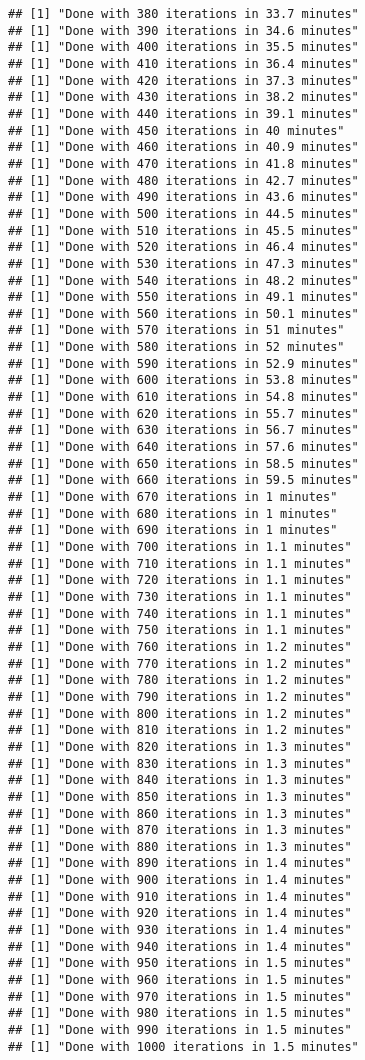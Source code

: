 \documentclass[]{article}
\begin{document}
\begin{verbatim}
## [1] "Done with 380 iterations in 33.7 minutes"
## [1] "Done with 390 iterations in 34.6 minutes"
## [1] "Done with 400 iterations in 35.5 minutes"
## [1] "Done with 410 iterations in 36.4 minutes"
## [1] "Done with 420 iterations in 37.3 minutes"
## [1] "Done with 430 iterations in 38.2 minutes"
## [1] "Done with 440 iterations in 39.1 minutes"
## [1] "Done with 450 iterations in 40 minutes"
## [1] "Done with 460 iterations in 40.9 minutes"
## [1] "Done with 470 iterations in 41.8 minutes"
## [1] "Done with 480 iterations in 42.7 minutes"
## [1] "Done with 490 iterations in 43.6 minutes"
## [1] "Done with 500 iterations in 44.5 minutes"
## [1] "Done with 510 iterations in 45.5 minutes"
## [1] "Done with 520 iterations in 46.4 minutes"
## [1] "Done with 530 iterations in 47.3 minutes"
## [1] "Done with 540 iterations in 48.2 minutes"
## [1] "Done with 550 iterations in 49.1 minutes"
## [1] "Done with 560 iterations in 50.1 minutes"
## [1] "Done with 570 iterations in 51 minutes"
## [1] "Done with 580 iterations in 52 minutes"
## [1] "Done with 590 iterations in 52.9 minutes"
## [1] "Done with 600 iterations in 53.8 minutes"
## [1] "Done with 610 iterations in 54.8 minutes"
## [1] "Done with 620 iterations in 55.7 minutes"
## [1] "Done with 630 iterations in 56.7 minutes"
## [1] "Done with 640 iterations in 57.6 minutes"
## [1] "Done with 650 iterations in 58.5 minutes"
## [1] "Done with 660 iterations in 59.5 minutes"
## [1] "Done with 670 iterations in 1 minutes"
## [1] "Done with 680 iterations in 1 minutes"
## [1] "Done with 690 iterations in 1 minutes"
## [1] "Done with 700 iterations in 1.1 minutes"
## [1] "Done with 710 iterations in 1.1 minutes"
## [1] "Done with 720 iterations in 1.1 minutes"
## [1] "Done with 730 iterations in 1.1 minutes"
## [1] "Done with 740 iterations in 1.1 minutes"
## [1] "Done with 750 iterations in 1.1 minutes"
## [1] "Done with 760 iterations in 1.2 minutes"
## [1] "Done with 770 iterations in 1.2 minutes"
## [1] "Done with 780 iterations in 1.2 minutes"
## [1] "Done with 790 iterations in 1.2 minutes"
## [1] "Done with 800 iterations in 1.2 minutes"
## [1] "Done with 810 iterations in 1.2 minutes"
## [1] "Done with 820 iterations in 1.3 minutes"
## [1] "Done with 830 iterations in 1.3 minutes"
## [1] "Done with 840 iterations in 1.3 minutes"
## [1] "Done with 850 iterations in 1.3 minutes"
## [1] "Done with 860 iterations in 1.3 minutes"
## [1] "Done with 870 iterations in 1.3 minutes"
## [1] "Done with 880 iterations in 1.3 minutes"
## [1] "Done with 890 iterations in 1.4 minutes"
## [1] "Done with 900 iterations in 1.4 minutes"
## [1] "Done with 910 iterations in 1.4 minutes"
## [1] "Done with 920 iterations in 1.4 minutes"
## [1] "Done with 930 iterations in 1.4 minutes"
## [1] "Done with 940 iterations in 1.4 minutes"
## [1] "Done with 950 iterations in 1.5 minutes"
## [1] "Done with 960 iterations in 1.5 minutes"
## [1] "Done with 970 iterations in 1.5 minutes"
## [1] "Done with 980 iterations in 1.5 minutes"
## [1] "Done with 990 iterations in 1.5 minutes"
## [1] "Done with 1000 iterations in 1.5 minutes"
\end{verbatim}
\end{document}
